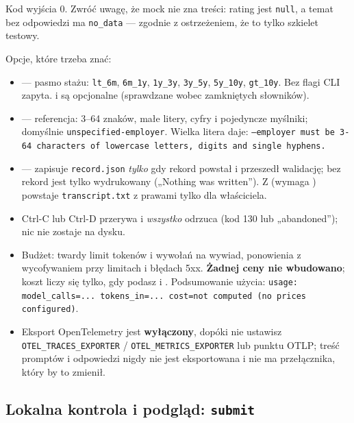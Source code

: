 {Kod wyjścia 0. Zwróć uwagę, że mock nie zna treści: rating jest \texttt{null},
a temat bez odpowiedzi ma \texttt{no\_data} --- zgodnie z ostrzeżeniem, że to
tylko szkielet testowy.

Opcje, które trzeba znać:

\begin{itemize}[leftmargin=*,itemsep=2pt]
  \item {} --- pasmo stażu: \texttt{lt\_6m}, \texttt{6m\_1y},
        \texttt{1y\_3y}, \texttt{3y\_5y}, \texttt{5y\_10y}, \texttt{gt\_10y}. Bez
        flagi CLI zapyta.  i  są
        opcjonalne (sprawdzane wobec zamkniętych słowników).
  \item {} --- referencja: 3--64 znaków, małe litery, cyfry i
        pojedyncze myślniki; domyślnie \texttt{unspecified-\allowbreak{}employer}. Wielka
        litera daje: \texttt{--employer must be 3-64 characters of lowercase
        letters, digits and single hyphens.}
  \item {} --- zapisuje \texttt{record.json}
        \emph{tylko} gdy rekord powstał i przeszedł walidację; bez 
        rekord jest tylko wydrukowany („Nothing was written”). Z
         (wymaga ) powstaje
        \texttt{transcript.txt} z prawami tylko dla właściciela.
  \item Ctrl-C lub Ctrl-D przerywa i \emph{wszystko} odrzuca (kod 130 lub
        „abandoned”); nic nie zostaje na dysku.
  \item Budżet: twardy limit tokenów i wywołań na wywiad, ponowienia z
        wycofywaniem przy limitach i błędach 5xx. \textbf{Żadnej ceny nie
        wbudowano}; koszt liczy się tylko, gdy podasz  i
        . Podsumowanie użycia:
        \texttt{usage: model\_\allowbreak{}calls=... tokens\_\allowbreak{}in=... cost=not computed (no
        prices configured)}.
  \item Eksport OpenTelemetry jest \textbf{wyłączony}, dopóki nie ustawisz
        \texttt{OTEL\_\allowbreak{}TRACES\_\allowbreak{}EXPORTER} / \texttt{OTEL\_\allowbreak{}METRICS\_\allowbreak{}EXPORTER} lub
        punktu OTLP; treść promptów i odpowiedzi nigdy nie jest eksportowana i
        nie ma przełącznika, który by to zmienił.
\end{itemize}

\subsection{Lokalna kontrola i podgląd: \texttt{submit}}

}
